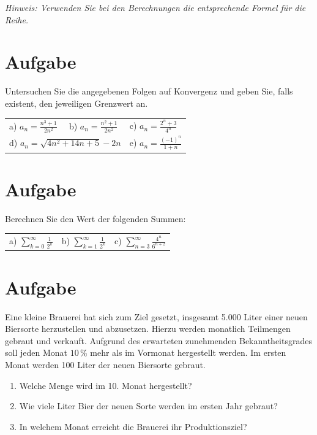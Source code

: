 \documentclass[fontsize=11pt, parskip=half]{scrartcl}
\begin{document}
\emph{Hinweis: Verwenden Sie bei den Berechnungen die entsprechende
Formel für die Reihe.}

\section{Aufgabe}
Untersuchen Sie die angegebenen Folgen auf Konvergenz und
geben Sie, falls existent, den jeweiligen Grenzwert an.\\

\begin{tabular}{lll}
a) $\displaystyle{a_n = \frac{n^3 +1}{2n^2}}$ & b) $\displaystyle{a_n = \frac{n^2 +1}{2n^2}}$ & c) $\displaystyle{a_n = \frac{2^n +3}{4^n}}$
\\[0.5cm]
\multicolumn{2}{l}{d) $\displaystyle{a_n = \sqrt{4n^2+14n+5} -2n}$}
& e) $\displaystyle{a_n = \frac{(-1)^n}{1+n}}$

\end{tabular}

\section{Aufgabe}
Berechnen Sie den Wert der folgenden Summen:\\

\begin{tabular}{lll}
a) $\displaystyle{ \sum_{k=0}^{\infty}\frac{1}{2^{k}}}$ & b)
$\displaystyle{ \sum_{k=1}^{\infty}\frac{1}{2^{k}}}$ & c)
$\displaystyle{ \sum_{n=3}^{\infty}\frac{4^n}{6^{n+2}}}$
\end{tabular}

\section{Aufgabe}
Eine kleine Brauerei hat sich zum Ziel gesetzt,
insgesamt 5.000 Liter einer neuen Biersorte herzustellen und
abzusetzen. Hierzu werden monatlich Teilmengen gebraut und verkauft.
Aufgrund des erwarteten zunehmenden Bekanntheitsgrades soll jeden
Monat $10 \,\%$ mehr als im Vormonat hergestellt werden. Im ersten
Monat werden 100 Liter der neuen Biersorte gebraut.

\begin{enumerate}[label=\alph*)]
 \item Welche Menge wird im 10. Monat hergestellt?
 \item Wie viele Liter Bier der neuen Sorte werden im ersten Jahr gebraut?
 \item In welchem Monat erreicht die Brauerei ihr Produktionsziel?
 \end{enumerate}
\end{document}
